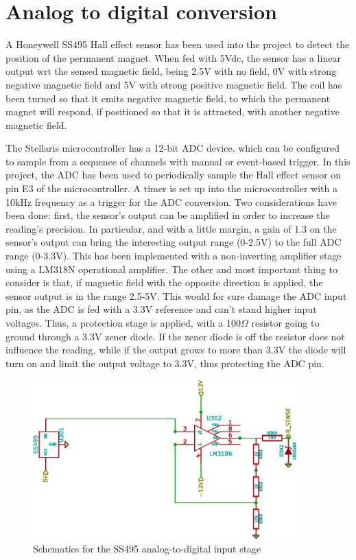 \section{Analog to digital conversion}
A Honeywell SS495 Hall effect sensor has been used into the project to detect the position of the permanent magnet. When fed with 5Vdc, the sensor has a linear output wrt the sensed magnetic field, being 2.5V with no field, 0V with strong negative magnetic field and 5V with strong positive magnetic field. The coil has been turned so that it emits negative magnetic field, to which the permanent magnet will respond, if positioned so that it is attracted, with another negative magnetic field.

The Stellaris microcontroller has a 12-bit ADC device, which can be configured to sample from a sequence of channels with manual or event-based trigger. In this project, the ADC has been used to periodically sample the Hall effect sensor on pin E3 of the microcontroller. A timer is set up into the microcontroller with a 10kHz frequency as a trigger for the ADC conversion. Two considerations have been done: first, the sensor's output can be amplified in order to increase the reading's precision. In particular, and with a little margin, a gain of 1.3 on the sensor's output can bring the interesting output range (0-2.5V) to the full ADC range (0-3.3V). This has been implemented with a non-inverting amplifier stage using a LM318N operational amplifier. The other and most important thing to consider is that, if magnetic field with the opposite direction is applied, the sensor output is in the range 2.5-5V. This would for sure damage the ADC input pin, as the ADC is fed with a 3.3V reference and can't stand higher input voltages. Thus, a protection stage is applied, with a 100$\Omega$ resistor going to ground through a 3.3V zener diode. If the zener diode is off the resistor does not influence the reading, while if the output grows to more than 3.3V the diode will turn on and limit the output voltage to 3.3V, thus protecting the ADC pin.

\begin{figure}[htbp]
\centering
\includegraphics[width=4in]{Graphics/inputStage}
\caption{Schematics for the SS495 analog-to-digital input stage}
\end{figure}

